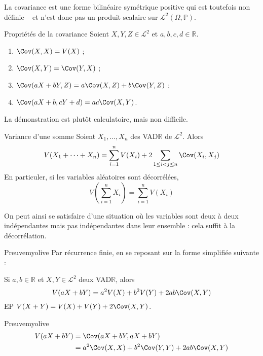     La covariance est une forme bilinéaire symétrique positive qui est toutefois non définie -- et n’est donc pas un produit scalaire sur $\mathcal{L}^2(\Omega, \mathbb{P})$. 

    \begin{prop}{Propriétés de la covariance}{}
        Soient $X,Y, Z \in \mathcal{L}^2$ et $a,b,c,d \in \mathbb{R}$. 
        \begin{enumerate}
            \item $\Cov(X,X) = V(X)$ ;
            \item $\Cov(X,Y) = \Cov(Y,X)$ ;
            \item $\Cov(aX + bY, Z) = a\Cov(X,Z) + b \Cov(Y,Z)$ ;
            \item $\Cov(aX + b, cY + d) = ac \Cov(X,Y)$.
        \end{enumerate}
    \end{prop}

    La démonstration est plutôt calculatoire, mais non difficile. 

    \begin{prop}{Variance d’une somme}{}
        Soient $X_1,\ldots,X_n$ des VAD$\mathbb{R}$ de $\mathcal{L}^2$. Alors 
        \[ V(X_1 + \cdots + X_n) = \sum_{i=1}^n V(X_i) + 2 \sum_{1 \leq i < j \leq n} \Cov(X_i,X_j) \]
        En particuler, si les variables aléatoires sont décorrélées, 
        \[ V(\sum_{i=1}^{n} X_i) = \sum_{i=1}^{n} V(X_i) \]   
    \end{prop}

    On peut ainsi se satisfaire d’une situation où les variables sont deux à deux indépendantes mais pas indépendantes dans leur ensemble : cela suffit à la décorrélation.

    \begin{demo}{Preuve}{myolive}
        Par récurrence finie, en se reposant sur la forme simplifiée suivante : 
    \end{demo}

    \begin{prop}{}{}
        Si $a,b \in \mathbb{R}$ et $X,Y \in \mathcal{L}^2$ deux VAD$\mathbb{R}$, alors 
        \[ V(aX + bY) = a^2 V(X) + b^2 V(Y) + 2ab \Cov(X,Y) \]   
        EP $V(X + Y) = V(X) + V(Y) + 2 \Cov(X,Y)$.
    \end{prop}

    \begin{demo}{Preuve}{myolive}
        \begin{align*}
            V(aX + bY) 
            &= \Cov(aX + bY, aX + bY) \\
            &= a^2 \Cov(X,X) + b^2 \Cov(Y,Y) + 2ab\Cov(X,Y) 
        \end{align*}
    \end{demo}

